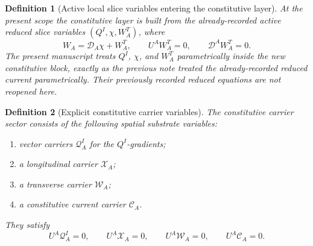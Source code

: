 \documentclass[11pt]{article}
\newcommand{\SpatialD}{\mathcal D}
\newcommand{\ConstCurrent}{\mathcal C}
\newcommand{\QCarrier}{\mathcal Q}
\newcommand{\ChiCarrier}{\mathcal X}
\newcommand{\TransCarrier}{\mathcal W}
\newtheorem{definition}{Definition}
\begin{document}
\begin{definition}[Active local slice variables entering the constitutive layer]
\label{def:activeslice}
At the present scope the constitutive layer is built from the already-recorded active reduced slice variables \((Q^I,\chi,W_A^T)\), where
\begin{equation}
W_A=\SpatialD_A\chi+W_A^T,
\qquad
U^AW_A^T=0,
\qquad
\SpatialD^AW_A^T=0.
\label{eq:Wdecomp}
\end{equation}
The present manuscript treats \(Q^I\), \(\chi\), and \(W_A^T\) parametrically inside the new constitutive block, exactly as the previous note treated the already-recorded reduced current parametrically. Their previously recorded reduced equations are not reopened here.
\end{definition}

\begin{definition}[Explicit constitutive carrier variables]
\label{def:carriers}
The \emph{constitutive carrier sector} consists of the following spatial substrate variables:
\begin{enumerate}
    \item vector carriers \(\QCarrier^I_A\) for the \(Q^I\)-gradients;
    \item a longitudinal carrier \(\ChiCarrier_A\);
    \item a transverse carrier \(\TransCarrier_A\);
    \item a constitutive current carrier \(\ConstCurrent_A\).
\end{enumerate}
They satisfy
\begin{equation}
U^A\QCarrier^I_A=0,
\qquad
U^A\ChiCarrier_A=0,
\qquad
U^A\TransCarrier_A=0,
\qquad
U^A\ConstCurrent_A=0.
\label{eq:carrierspatial}
\end{equation}
\end{definition}
\end{document}
